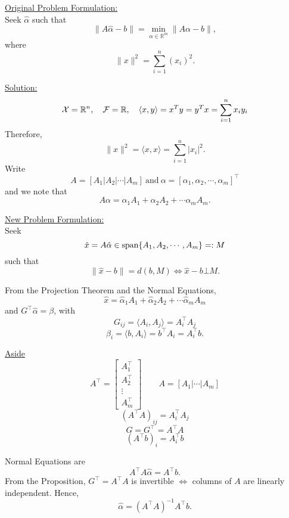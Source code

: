 \documentclass[letterpaper]{article}
\begin{document}
\underline{Original Problem Formulation:}\\
Seek $\hat{\alpha} $ such that $$\| A \hat{\alpha}-b \|=\min_{\alpha \in \mathbb{R}^m} \| A \alpha -b \|,$$
where $$\|x\|^2 =\sum\limits_{i=1}^n (x_i)^2. $$

\underline{Solution:}
$${\cal X}=\mathbb{R}^n, \quad {\cal F}=\mathbb{R}, \quad  \langle x,y \rangle = x^T y= y^T x= \sum\limits_{i=1}^n x_i y_i$$
Therefore,  $$\|x\|^2= \langle x,x \rangle =\sum\limits_{i=1}^n |x_i|^2.$$
Write $$A=[A_1 | A_2 | \cdots | A_m] ~\text{and}~\alpha = [\alpha_1, \alpha_2,  \cdots, \alpha_m]^\top$$
and we note that
$$ A \alpha = \alpha_1 A_1 + \alpha_2 A_2 + \cdots \alpha_m A_m.$$

\underline{New Problem Formulation:}\\
Seek $$\hat{x} = A \hat{\alpha} \in {\rm span}\{ A_1,A_2, \cdots, A_m \} =: M$$
such that $$ \|\hat{x}-b\|=d(b,M) \Leftrightarrow \hat{x}-b \bot M.$$

\newpage

From the Projection Theorem and the Normal Equations,
$$\hat{x}=\hat{\alpha}_1 A_1 +\hat{\alpha}_2 A_2 + \cdots \hat{\alpha}_m A_m $$
and $G^\top \hat{\alpha}=\beta$, with
$$G_{ij}= \langle A_i,A_j \rangle =A_i ^\top A_j$$ $$\beta_i =  \langle b,A_i \rangle  = b^\top A_i = A_i^\top b.$$



\underline{Aside}
$$A^\top=\begin{bmatrix} A_1^\top \\ A_2^\top \\ \vdots \\ A_m^\top  \end{bmatrix} \qquad A=[A_1| \cdots | A_m ]$$ $$(A^\top A)_{ij}=A^\top_i A_j$$
$$G=G^\top=A^\top A$$ $$(A^\top b)_i=A_i^\top b$$

Normal Equations are $$A^\top A \hat{\alpha} =A^\top b.$$
From the Proposition, $G^\top =A^\top A $ is invertible $ \Leftrightarrow $  columns of $A$ are linearly independent. Hence, $$\hat{\alpha}=(A^\top A)^{-1} A^\top b.$$

%
%
\end{document}
